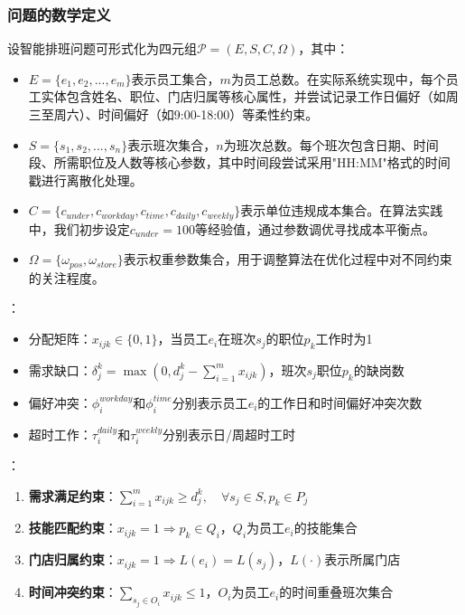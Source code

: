 \documentclass{ctexart}
\begin{document}
\subsubsection{问题的数学定义}
设智能排班问题可形式化为四元组$\mathcal{P}=(E, S, C, \Omega)$，其中：
\begin{itemize}
    \item $E = \{e_1,e_2,...,e_m\}$表示员工集合，$m$为员工总数。在实际系统实现中，每个员工实体包含姓名、职位、门店归属等核心属性，并尝试记录工作日偏好（如周三至周六）、时间偏好（如9:00-18:00）等柔性约束。
    \item $S = \{s_1,s_2,...,s_n\}$表示班次集合，$n$为班次总数。每个班次包含日期、时间段、所需职位及人数等核心参数，其中时间段尝试采用"HH:MM"格式的时间戳进行离散化处理。
    \item $C = \{c_{under},c_{workday},c_{time},c_{daily},c_{weekly}\}$表示单位违规成本集合。在算法实践中，我们初步设定$c_{under}=100$等经验值，通过参数调优寻找成本平衡点。
    \item $\Omega = \{\omega_{pos}, \omega_{store}\}$表示权重参数集合，用于调整算法在优化过程中对不同约束的关注程度。
\end{itemize}

{}：
\begin{itemize}
    \item 分配矩阵：$x_{ijk} \in \{0,1\}$，当员工$e_i$在班次$s_j$的职位$p_k$工作时为1
    \item 需求缺口：$\delta_j^k = \max(0, d_j^k - \sum_{i=1}^m x_{ijk})$，班次$s_j$职位$p_k$的缺岗数
    \item 偏好冲突：$\phi_i^{workday}$和$\phi_i^{time}$分别表示员工$e_i$的工作日和时间偏好冲突次数
    \item 超时工作：$\tau_i^{daily}$和$\tau_i^{weekly}$分别表示日/周超时工时
\end{itemize}

{}：
\begin{enumerate}
    \item \textbf{需求满足约束}：$\sum_{i=1}^m x_{ijk} \geq d_j^k,\quad \forall s_j \in S, p_k \in P_j$
    \item \textbf{技能匹配约束}：$x_{ijk} = 1 \Rightarrow p_k \in Q_i$，$Q_i$为员工$e_i$的技能集合
    \item \textbf{门店归属约束}：$x_{ijk} = 1 \Rightarrow L(e_i) = L(s_j)$，$L(\cdot)$表示所属门店
    \item \textbf{时间冲突约束}：$\sum_{s_j \in O_i} x_{ijk} \leq 1$，$O_i$为员工$e_i$的时间重叠班次集合
\end{enumerate}
\end{document}

